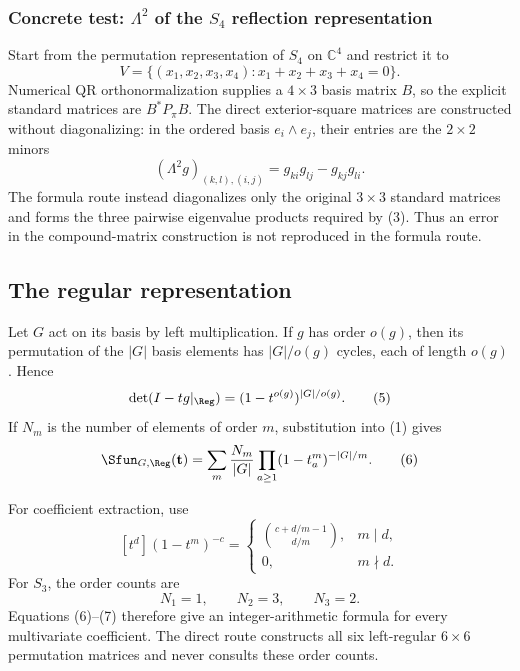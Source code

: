 \documentclass[10pt]{article}
\begin{document}
\subsubsection{Concrete test: $\Lambda^2$ of the $S_4$ reflection representation}

Start from the permutation representation of $S_4$ on $\mathbb C^4$ and
restrict it to
\[
V=\{(x_1,x_2,x_3,x_4):x_1+x_2+x_3+x_4=0\}.
\]
Numerical QR orthonormalization supplies a $4\times3$ basis matrix $B$, so the
explicit standard matrices are $B^*P_\pi B$.  The direct exterior-square
matrices are constructed without diagonalizing: in the ordered basis
$e_i\wedge e_j$, their entries are the $2\times2$ minors
\begin{equation}
(\Lambda^2g)_{(k,l),(i,j)}
=g_{ki}g_{lj}-g_{kj}g_{li}.                                  \tag{4}
\end{equation}
The formula route instead diagonalizes only the original $3\times3$ standard
matrices and forms the three pairwise eigenvalue products required by (3).
Thus an error in the compound-matrix construction is not reproduced in the
formula route.

\subsection{The regular representation}

Let $G$ act on its basis by left multiplication.  If $g$ has order $o(g)$,
then its permutation of the $|G|$ basis elements has $|G|/o(g)$ cycles, each of
length $o(g)$.  Hence
\begin{equation}
\det(I-tg|_{\Reg})=(1-t^{o(g)})^{|G|/o(g)}.                   \tag{5}
\end{equation}
If $N_m$ is the number of elements of order $m$, substitution into (1) gives
\begin{equation}
\Sfun_{G,\Reg}(\mathbf t)=\sum_m\frac{N_m}{|G|}
\prod_{a\geq1}(1-t_a^m)^{-|G|/m}.                            \tag{6}
\end{equation}

For coefficient extraction, use
\[
[t^d](1-t^m)^{-c}=
\begin{cases}
\binom{c+d/m-1}{d/m},&m\mid d,\\
0,&m\nmid d.
\end{cases}
\]
For $S_3$, the order counts are
\begin{equation}
N_1=1,\qquad N_2=3,\qquad N_3=2.                              \tag{7}
\end{equation}
Equations (6)--(7) therefore give an integer-arithmetic formula for every
multivariate coefficient.  The direct route constructs all six left-regular
$6\times6$ permutation matrices and never consults these order counts.
\end{document}
